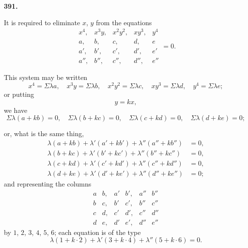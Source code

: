 \documentclass[11pt,a4paper]{article}
\theoremstyle{plain}
\begin{document}
\setcounter{equation}{0}

\textbf{391.}

It is required to eliminate $x$, $y$ from the equations
\begin{equation}
\begin{matrix}
x^4, & x^3y, & x^2y^2, & xy^3, & y^4 \\
a, & b, & c, & d, & e \\
a', & b', & c', & d', & e' \\
a'', & b'', & c'', & d'', & e''
\end{matrix} = 0.
\end{equation}

This system may be written
\begin{equation}
x^4 = \Sigma\lambda a, \quad x^3y = \Sigma\lambda b, \quad x^2y^2 = \Sigma\lambda c, \quad xy^3 = \Sigma\lambda d, \quad y^4 = \Sigma\lambda e;
\end{equation}
or putting
\begin{equation}
y = kx,
\end{equation}
we have
\begin{equation}
\Sigma\lambda(a+kb) = 0, \quad \Sigma\lambda(b+kc) = 0, \quad \Sigma\lambda(c+kd) = 0, \quad \Sigma\lambda(d+ke) = 0;
\end{equation}

\newpage
\setcounter{equation}{4}

or, what is the same thing,
\begin{align}
\lambda(a + kb) + \lambda'(a' + kb') + \lambda''(a'' + kb'') &= 0, \\
\lambda(b + kc) + \lambda'(b' + kc') + \lambda''(b'' + kc'') &= 0, \\
\lambda(c + kd) + \lambda'(c' + kd') + \lambda''(c'' + kd'') &= 0, \\
\lambda(d + ke) + \lambda'(d' + ke') + \lambda''(d'' + ke'') &= 0;
\end{align}
and representing the columns
\begin{equation}
\begin{array}{cc|cc|cc}
a & b, & a' & b', & a'' & b'' \\
b & c, & b' & c', & b'' & c'' \\
c & d, & c' & d', & c'' & d'' \\
d & e, & d' & e', & d'' & e''
\end{array}
\end{equation}
by $1$, $2$, $3$, $4$, $5$, $6$;
each equation is of the type
\begin{equation}
\lambda(1 + k\cdot 2) + \lambda'(3 + k\cdot 4) + \lambda''(5 + k\cdot 6) = 0.
\end{equation}
\end{document}
